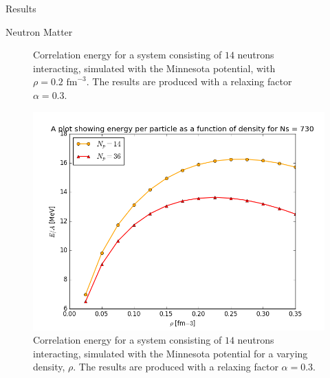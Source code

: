 \documentclass[twoside,english]{uiofysmaster}
\begin{document}
\begin{chapter}{Results}
\begin{section}{Neutron Matter}
\begin{figure}[]
      \caption{Correlation energy for a system consisting of $14$ neutrons interacting, simulated with the Minnesota potential, with $\rho=0.2\text{ fm}^{-3}$. The results are produced with a relaxing factor $\alpha=0.3$. }
      \label{figure:thermodynamic_limit}
    \end{figure}
    \begin{figure}[]
      \includegraphics[width=\textwidth]{../NuclearMatter/Results/Figures/Vary_rho_Nh14.png}
      \caption{Correlation energy for a system consisting of $14$ neutrons interacting, simulated with the Minnesota potential for a varying density, $\rho$.  The results are produced with a relaxing factor $\alpha=0.3$. }
      \label{figure:thermodynamic_limit}
    \end{figure}
    
    
  \end{section}

\end{chapter}
\end{document}
